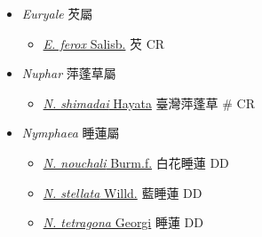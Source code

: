 
  \begin{itemize}
 \item[] \textit{Euryale} 芡屬
                                
  \begin{itemize}
        \item[] \href{http://www.theplantlist.org/tpl1.1/search?q=Euryale+ferox}{\textit{E. ferox} Salisb.}   芡   CR
  \end{itemize}
 \item[] \textit{Nuphar} 萍蓬草屬
                                
  \begin{itemize}
        \item[] \href{http://www.theplantlist.org/tpl1.1/search?q=Nuphar+shimadai}{\textit{N. shimadai} Hayata}   臺灣萍蓬草  \# CR
  \end{itemize}
 \item[] \textit{Nymphaea} 睡蓮屬
                                
  \begin{itemize}
        \item[] \href{http://www.theplantlist.org/tpl1.1/search?q=Nymphaea+nouchali}{\textit{N. nouchali} Burm.f.}   白花睡蓮   DD
        \item[] \href{http://www.theplantlist.org/tpl1.1/search?q=Nymphaea+stellata}{\textit{N. stellata} Willd.}   藍睡蓮   DD
        \item[] \href{http://www.theplantlist.org/tpl1.1/search?q=Nymphaea+tetragona}{\textit{N. tetragona} Georgi}   睡蓮   DD
  \end{itemize}
  \end{itemize}
